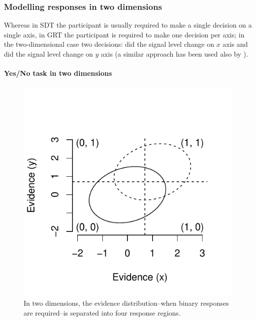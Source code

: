 \documentclass{article}\usepackage{knitr}
\begin{document}
\subsubsection{Modelling responses in two dimensions}
\label{sec:modelling_responses}

Whereas in SDT the participant is usually required to make a single decision on a single axis, in GRT the participant is required to make one decision per axis; in the two-dimensional case two decisions: did the signal level change on $x$ axis and did the signal level change on $y$ axis (a similar approach has been used also by \cite{wickens1992}). 

\paragraph{Yes/No task in two dimensions}

\begin{figure}
\begin{center}
\begin{knitrout}
\color{fgcolor}
\includegraphics[width=\maxwidth]{figure/unnamed-chunk-8-1} 

\end{knitrout}
\end{center}
\caption{In two dimensions, the evidence distribution--when binary responses are required--is separated into four response regions.}
\label{fig:GRTsimple}
\end{figure}
\end{document}
